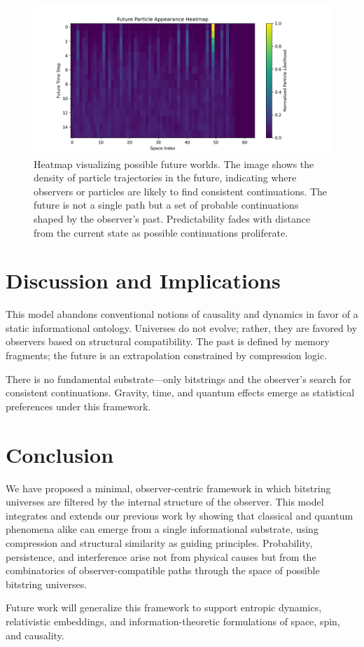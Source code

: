 \documentclass[12pt]{article}
\begin{document}
\begin{figure}[h!]
    \centering
    \includegraphics[width=1.0\textwidth]{figures/future_particle_heatmap.png}
    \caption{Heatmap visualizing possible future worlds. The image shows the density of particle trajectories in the future, indicating where observers or particles are likely to find consistent continuations. The future is not a single path but a set of probable continuations shaped by the observer's past. Predictability fades with distance from the current state as possible continuations proliferate.}
    \label{fig:future_particle_heatmap}
\end{figure}

\section{Discussion and Implications}

This model abandons conventional notions of causality and dynamics in favor of a static informational ontology. Universes do not evolve; rather, they are favored by observers based on structural compatibility. The past is defined by memory fragments; the future is an extrapolation constrained by compression logic.

There is no fundamental substrate—only bitstrings and the observer's search for consistent continuations. Gravity, time, and quantum effects emerge as statistical preferences under this framework.


\section{Conclusion}

We have proposed a minimal, observer-centric framework in which bitstring universes are filtered by the internal structure of the observer. This model integrates and extends our previous work by showing that classical and quantum phenomena alike can emerge from a single informational substrate, using compression and structural similarity as guiding principles. Probability, persistence, and interference arise not from physical causes but from the combinatorics of observer-compatible paths through the space of possible bitstring universes.

Future work will generalize this framework to support entropic dynamics, relativistic embeddings, and information-theoretic formulations of space, spin, and causality.
\end{document}

